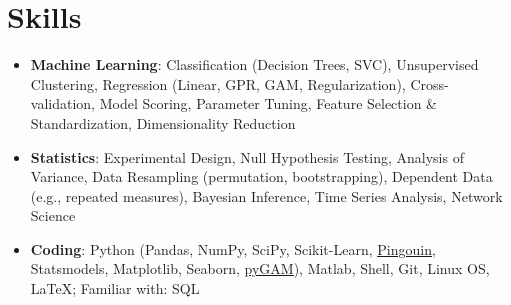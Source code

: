 \documentclass[letterpaper,10pt]{article}
\newcommand{\resumeSubHeadingListStart}{\begin{itemize}[leftmargin=*]}
\newcommand{\resumeSubHeadingListEnd}{\end{itemize}}
\begin{document}
\section{Skills}
 \resumeSubHeadingListStart
   \item{
    \textbf{Machine Learning}{: Classification (Decision Trees, SVC), Unsupervised Clustering, Regression (Linear, GPR, GAM, Regularization), Cross-validation, Model Scoring, Parameter Tuning, Feature Selection \& Standardization, Dimensionality Reduction}
    }
   \item{
    \textbf{Statistics}{: Experimental Design, Null Hypothesis Testing, Analysis of Variance, Data Resampling (permutation, bootstrapping), Dependent Data (e.g., repeated measures), Bayesian Inference, Time Series Analysis, Network Science}
    }
   \item{
    \textbf{Coding}{: Python (Pandas, NumPy, SciPy, Scikit-Learn, \href{https://pingouin-stats.org/}{\underline{Pingouin}}, Statsmodels, Matplotlib, Seaborn, \href{https://pygam.readthedocs.io/en/latest/}{\underline{pyGAM}}), Matlab, Shell, Git, Linux OS, LaTeX; Familiar with: SQL}
    }
 \resumeSubHeadingListEnd


\end{document}

